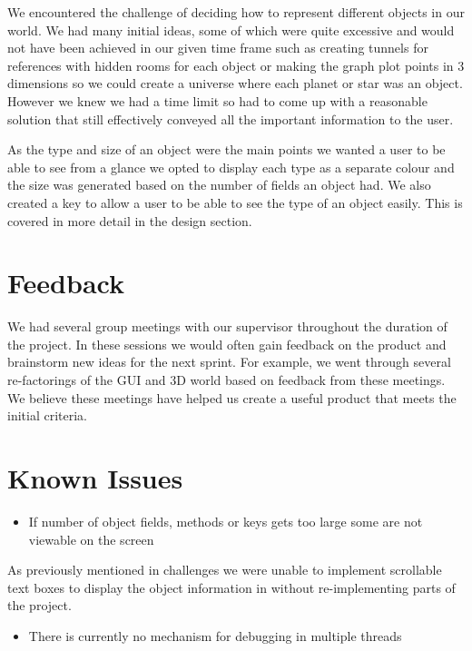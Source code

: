 \documentclass[11pt, a4paper]{report}
\begin{document}
We encountered the challenge of deciding how to represent different objects in our world. We had many initial ideas, some of which were quite excessive and would not have been achieved in our given time frame such as creating tunnels for references with hidden rooms for each object or making the graph plot points in 3 dimensions so we could create a universe where each planet or star was an object. However we knew we had a time limit so had to come up with a reasonable solution that still effectively conveyed all the important information to the user.

As the type and size of an object were the main points we wanted a user to be able to see from a glance we opted to display each type as a separate colour and the size was generated based on the number of fields an object had. We also created a key to allow a user to be able to see the type of an object easily. This is covered in more detail in the design section. 

\section{Feedback}

We had several group meetings with our supervisor throughout the duration of the project. In these sessions we would often gain feedback on the product and brainstorm new ideas for the next sprint. For example, we went through several re-factorings of the GUI and 3D world based on feedback from these meetings. We believe these meetings have helped us create a useful product that meets the initial criteria.

\section{Known Issues}

\begin{itemize}
  \item If number of object fields, methods or keys gets too large some are not viewable on the screen
\end{itemize}

As previously mentioned in challenges we were unable to implement scrollable text boxes to display the object information in without re-implementing parts of the project.

\begin{itemize}
  \item There is currently no mechanism for debugging in multiple threads
\end{itemize}
\end{document}
